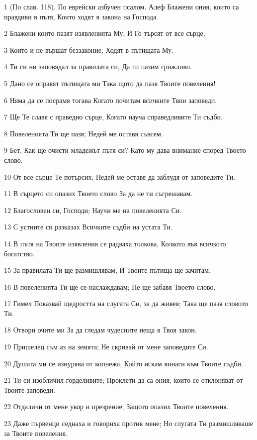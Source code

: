 \par 1 (По слав. 118). По еврейски азбучен псалом. Алеф Блажени ония, които са правдиви в пътя, Които ходят в закона на Господа.
\par 2 Блажени които пазят изявленията Му, И Го търсят от все сърце;
\par 3 Които и не вършат беззаконие, Ходят в пътищата Му.
\par 4 Ти си ни заповядал за правилата си, Да ги пазим грижливо.
\par 5 Дано се оправят пътищата ми Така щото да пазя Твоите повеления!
\par 6 Няма да се посрамя тогава Когато почитам всичките Твои заповеди.
\par 7 Ще Те славя с праведно сърце, Когато науча справедливите Ти съдби.
\par 8 Повеленията Ти ще пазя; Недей ме оставя съвсем.
\par 9 Бет. Как ще очисти младежът пътя си? Като му дава внимание според Твоето слово.
\par 10 От все сърце Те потърсих; Недей ме оставя да заблудя от заповедите Ти.
\par 11 В сърцето си опазих Твоето слово За да не ти съгрешавам.
\par 12 Благословен си, Господи; Научи ме на повеленията Си.
\par 13 С устните си разказах Всичките съдби на устата Ти.
\par 14 В пътя на Твоите изявления се радваха толкова, Колкото във всичкото богатство.
\par 15 За правилата Ти ще размишлявам, И Твоите пътища ще зачитам.
\par 16 В повеленията Ти ще се наслаждавам; Не ще забавя Твоето слово.
\par 17 Гимел Показвай щедростта на слугата Си, за да живея; Така ще пазя словото Ти.
\par 18 Отвори очите ми За да гледам чудесните неща в Твоя закон.
\par 19 Пришелец съм аз на земята; Не скривай от мене заповедите Си.
\par 20 Душата ми се изнурява от копнежа, Който искам винаги към Твоите съдби.
\par 21 Ти си изобличил горделивите; Проклети да са ония, които се отклоняват от Твоите заповеди.
\par 22 Отдаличи от мене укор и презрение, Защото опазих Твоите повеления.
\par 23 Даже първенци седнаха и говориха против мене; Но слугата Ти размишляваше за Твоите повеления.
